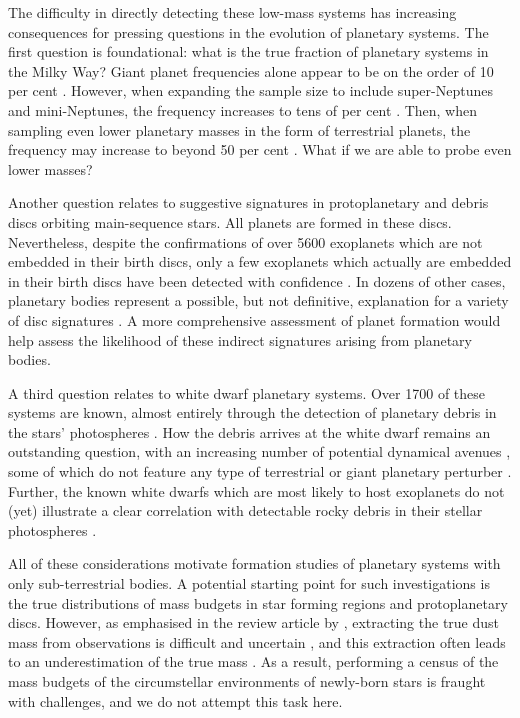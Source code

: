 \documentclass[useAMS,usenatbib]{mn2e}
\newcommand{\rev}{ }
\begin{document}
The difficulty in directly detecting these low-mass systems has increasing consequences for pressing questions in the evolution of planetary systems. The first question is foundational: what is the true fraction of planetary systems in the Milky Way? Giant planet frequencies alone appear to be on the order of 10 per cent \citep{bownie2018,baretal2019,fuletal2021}. However,  when expanding the sample size to include super-Neptunes and mini-Neptunes, the frequency increases  to tens of per cent \citep{vacetal2024}. Then, when sampling even lower planetary masses in the form of terrestrial planets, the frequency may increase to beyond 50 per cent \citep{casetal2012,heetal2021}. What if we are able to probe even lower masses?

Another question relates to suggestive signatures in protoplanetary and debris discs orbiting main-sequence stars. All planets are formed in these discs. Nevertheless, despite the confirmations of over 5600 exoplanets which are not embedded in their birth discs, only a few exoplanets which actually are embedded in their birth discs have been detected with confidence \citep{kepetal2018,hafetal2019}. In dozens of other cases, planetary bodies represent a possible, but not definitive, explanation for a variety of disc signatures \citep{pinetal2023,pearce2024}. A more comprehensive assessment of planet formation would help assess the likelihood of these indirect signatures arising from planetary bodies.

A third question relates to white dwarf planetary systems. Over 1700 of these systems are known, almost entirely through the detection of planetary debris in the stars' photospheres \citep{wiletal2024}. How the debris arrives at the white dwarf remains an outstanding question, with an increasing number of potential dynamical avenues \citep[e.g.][]{trietal2022,ocoetal2023,akietal2024,pharei2024}, some of which do not feature any type of terrestrial or giant planetary perturber \citep{veretal2022}. Further, the known white dwarfs which are most likely to host exoplanets do not (yet) illustrate a clear correlation with detectable rocky debris in their stellar photospheres {\rev \citep{thoetal1993,sigetal2003,luhetal2011,ganetal2019,vanetal2020,blaetal2021,limetal2024,muletal2024,zhaetal2024}}.

All of these considerations motivate formation studies of planetary systems with only sub-terrestrial bodies. A potential starting point for such investigations is the true distributions of mass budgets in star forming regions and protoplanetary discs. However, as emphasised in the review article by \cite{draetal2023}, extracting the true dust mass from observations is difficult and uncertain \citep{muletal2021,mioetal2023}, and this extraction often leads to an underestimation of the true mass \citep{zhuetal2019}. As a result, performing a census of the mass budgets of the circumstellar environments of newly-born stars is fraught with challenges, and we do not attempt this task here.
\end{document}
